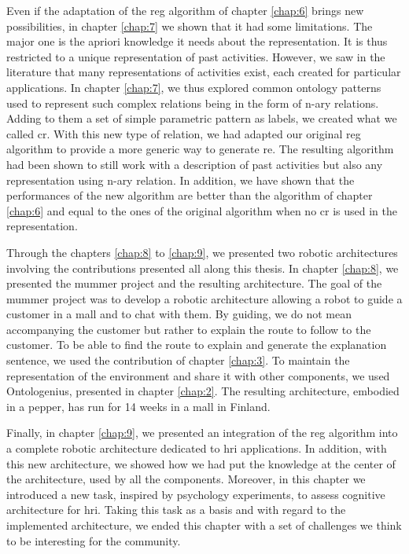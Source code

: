 Even if the adaptation of the \acrshort{reg} algorithm of chapter \ref{chap:6} brings new possibilities, in chapter \ref{chap:7} we shown that it had some limitations. The major one is the apriori knowledge it needs about the representation. It is thus restricted to a unique representation of past activities. However, we saw in the literature that many representations of activities exist, each created for particular applications. In chapter \ref{chap:7}, we thus explored common ontology patterns used to represent such complex relations being in the form of n-ary relations. Adding to them a set of simple parametric pattern as labels, we created what we called \acrfull{cr}. With this new type of relation, we had adapted our original \acrshort{reg} algorithm to provide a more generic way to generate \acrshort{re}. The resulting algorithm had been shown to still work with a description of past activities but also any representation using n-ary relation. In addition, we have shown that the performances of the new algorithm are better than the algorithm of chapter \ref{chap:6} and equal to the ones of the original algorithm when no \acrshort{cr} is used in the representation.

Through the chapters \ref{chap:8} to \ref{chap:9}, we presented two robotic architectures involving the contributions presented all along this thesis. In chapter \ref{chap:8}, we presented the \acrfull{mummer} project and the resulting architecture. The goal of the \acrshort{mummer} project was to develop a robotic architecture allowing a robot to guide a customer in a mall and to chat with them. By guiding, we do not mean accompanying the customer but rather to explain the route to follow to the customer. To be able to find the route to explain and generate the explanation sentence, we used the contribution of chapter \ref{chap:3}. To maintain the representation of the environment and share it with other components, we used Ontologenius, presented in chapter \ref{chap:2}. The resulting architecture, embodied in a pepper, has run for 14 weeks in a mall in Finland.

Finally, in chapter \ref{chap:9}, we presented an integration of the \acrshort{reg} algorithm into a complete robotic architecture dedicated to \acrshort{hri} applications. In addition, with this new architecture, we showed how we had put the knowledge at the center of the architecture, used by all the components. Moreover, in this chapter we introduced a new task, inspired by psychology experiments, to assess cognitive architecture for \acrshort{hri}. Taking this task as a basis and with regard to the implemented architecture, we ended this chapter with a set of challenges we think to be interesting for the community.


